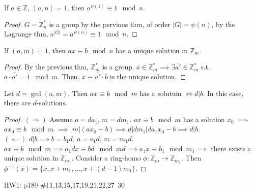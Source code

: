 \documentclass{article}
\begin{document}
\begin{multicols}{2}
\begin{mytheorem}
If $a\in \mathbb{Z}$, $(a,n)=1$, then $a^{\psi(1)}\equiv 1\mod n$.
\end{mytheorem}
\begin{proof}
$G=\mathbb{Z}_n^*$ is a group by the pervious thm, of order $|G|=\psi(n)$, by the Lagrange thm, $a^{|G|}=a^{\psi(n)}\equiv 1 \mod n$.
\end{proof}

\begin{mytheorem}
If $(a,m)=1$, then $ax\equiv b\mod n$ has a unique solution in $\mathbb{Z}_m$.
\end{mytheorem}
\begin{proof}
By the previous thm, $\mathbb{Z}_m^*$ is a group. $\overline{a}\in \mathbb{Z}_m^* \implies \exists \overline{a'}\in \mathbb{Z}_m^*$ s.t. $\overline{a}\cdot \overline{a'}=\overline{1}\mod m$. Then, $x\equiv \overline{a'}\cdot \overline{b}$ is the unique solution.
\end{proof}

\begin{mytheorem}
Let $d=\gcd(a,m)$. Then $ax\equiv b\mod m$ has a solutuin $\iff d|b$. In this case, there are $d$-solutions.
\end{mytheorem}
\begin{proof}
$(\Rightarrow)$ Assume $a=da_1$, $m=dm_1$. 
$ax\equiv b\mod m$ has a solution $x_0$ $\implies$ $ax_0\equiv b\mod m$ $\implies$ $m|(ax_0-b) \implies d|dm_1|da_1x_0-b\implies d|b$. \\
$(\Leftarrow)$ $d|b\implies b=b_1d$, $a=a_1d$, $m=m_1d$. $ax\equiv b\mod m \implies a_1dx\equiv bd \mod md \implies a_1x\equiv b_1 \mod m_1 \implies$ there exists a unique solution in $\mathbb{Z}_{m_1}$. Consider a ring-homo $\phi: \mathbb{Z}_m\to \mathbb{Z}_{m_1}$. Then $\phi^{-1}(x) = \{x,x+m_1,\dots,x+(d-1)m_1\}$.
\end{proof}

\begin{notebox}
HW1: p189 \#11,13,15,17,19,21,22,27~30
\end{notebox}


\end{multicols}
\end{document}
